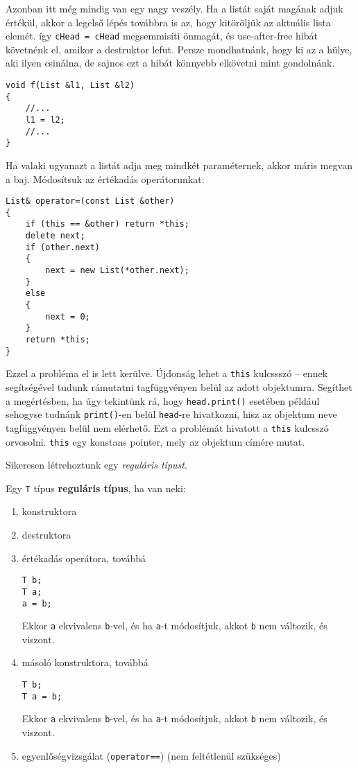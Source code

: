 \documentclass[a4paper,11.5pt]{article}
\begin{document}
	Azonban itt még mindig van egy nagy veszély. Ha a listát saját magának adjuk értékül, akkor a legelső lépés továbbra is az, hogy kitöröljük az aktuális lista elemét. így \texttt{cHead = cHead} megsemmisíti önmagát, és use-after-free hibát követnénk el, amikor a destruktor lefut. Persze mondhatnánk, hogy ki az a hülye, aki ilyen csinálna, de sajnos ezt a hibát könnyebb elkövetni mint gondolnánk.
	\begin{lstlisting}
void f(List &l1, List &l2)
{
	//...
	l1 = l2;
	//...
}
	\end{lstlisting}
	Ha valaki ugyanazt a listát adja meg mindkét paraméternek, akkor máris megvan a baj. Módosítsuk az értékadás operátorunkat:
\begin{lstlisting}
List& operator=(const List &other)
{
	if (this == &other) return *this;
	delete next;
	if (other.next)
	{
		next = new List(*other.next);
	}
	else
	{
		next = 0;
	}
	return *this;
}
\end{lstlisting}
	Ezzel a probléma el is lett kerülve. Újdonság lehet a \texttt{this} kulcssszó -- ennek segítségével tudunk rámutatni tagfüggvényen belül az adott objektumra. Segíthet a megértésben, ha úgy tekintünk rá, hogy \texttt{head.print()} esetében például sehogyse tudnánk \texttt{print()}-en belül \texttt{head}-re hivatkozni, hisz az objektum neve tagfüggvényen belül nem elérhető. Ezt a problémát hivatott a \texttt{this} kulcsszó orvosolni. \texttt{this} egy konstans pointer, mely az objektum címére mutat.
	\medskip

	Sikeresen létrehoztunk egy \textit{reguláris típust}.
	\begin{definition}
		Egy \texttt{T} típus \textbf{reguláris típus}, ha van neki:
		\begin{enumerate}
			\item konstruktora
			\item destruktora
			\item értékadás operátora, továbbá
			\begin{lstlisting}
T b;
T a;
a = b;
			\end{lstlisting}
			Ekkor \texttt{a} ekvivalens \texttt{b}-vel, és ha \texttt{a}-t módosítjuk, akkot \texttt{b} nem változik, és viszont.
			\item másoló konstruktora, továbbá
			\begin{lstlisting}
T b;
T a = b;
			\end{lstlisting}
			Ekkor \texttt{a} ekvivalens \texttt{b}-vel, és ha \texttt{a}-t módosítjuk, akkot \texttt{b} nem változik, és viszont.
			\item egyenlőségvizsgálat (\texttt{operator==}) (nem feltétlenül szükséges)
		\end{enumerate}
	\end{definition}
\end{document}
